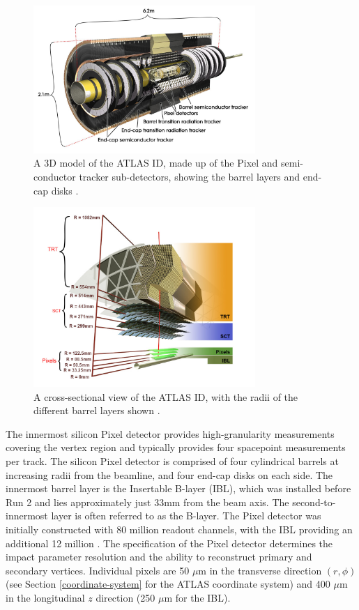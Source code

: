 \begin{figure}[!htbp]
  \centering
  \includegraphics[width=0.75\textwidth]{images/2-LHC-ATLAS/atlas_id.jpg}
  \caption{
    A 3D model of the ATLAS ID, made up of the Pixel and semi-conductor tracker sub-detectors, showing the barrel layers and end-cap disks \cite{atlasid}.
  }
  \label{fig:atlas-id-run1}
\end{figure}

\begin{figure}[!htbp]
  \centering
  \includegraphics[width=0.75\textwidth]{images/2-LHC-ATLAS/atlas_id_xs.png}
  \caption{
    A cross-sectional view of the ATLAS ID, with the radii of the different barrel layers shown \cite{atlastrackingdocs}.
  }
  \label{fig:atlas-id-run2}
\end{figure}

The innermost silicon Pixel detector \cite{pixel} provides high-granularity measurements covering the vertex region and typically provides four spacepoint measurements per track. The silicon Pixel detector is comprised of four cylindrical barrels at increasing radii from the beamline, and four end-cap disks on each side. The innermost barrel layer is the Insertable B-layer (IBL), which was installed before Run 2 \cite{ATLAS-TDR-19,PIX-2018-001} and lies approximately just 33mm from the beam axis. The second-to-innermost layer is often referred to as the B-layer. The Pixel detector was initially constructed with 80 million readout channels, with the IBL providing an additional 12 million \cite{ibl}. The specification of the Pixel detector determines the impact parameter resolution and the ability to reconstruct primary and secondary vertices. Individual pixels are 50 $\mu$m in the transverse direction $(r,\phi)$ (see Section \ref{coordinate-system} for the ATLAS coordinate system) and 400 $\mu$m in the longitudinal $z$ direction (250 $\mu$m for the IBL). 

